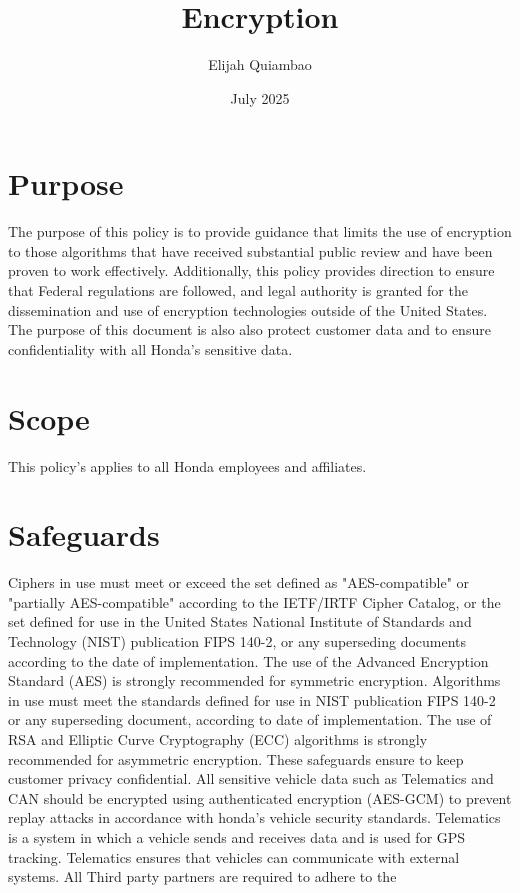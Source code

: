 \documentclass{article}
\title{Encryption}
\author{Elijah Quiambao}
\date{July 2025}
\begin{document}
\maketitle

\section{Purpose}
The purpose of this policy is to provide guidance that limits the use of encryption to those algorithms that have received substantial public review and have been proven to work effectively. Additionally, this policy provides direction to ensure that Federal regulations are followed, and legal authority is granted for the dissemination and use of encryption technologies outside of the United States. The purpose of this document is also also protect customer data and to ensure confidentiality with all Honda's sensitive data. 

\section{Scope}
This policy's applies to all Honda employees and affiliates.

\section{Safeguards}
Ciphers in use must meet or exceed the set defined as "AES-compatible" or "partially AES-compatible" according to the IETF/IRTF Cipher Catalog, or the set defined for use in the United States National Institute of Standards and Technology (NIST) publication FIPS 140-2, or any superseding documents according to the date of implementation. The use of the Advanced Encryption Standard (AES) is strongly recommended for symmetric encryption.
Algorithms in use must meet the standards defined for use in NIST publication FIPS 140-2 or any superseding document, according to date of implementation. The use of RSA and Elliptic Curve Cryptography (ECC) algorithms is strongly recommended for asymmetric encryption. These safeguards ensure to keep customer privacy confidential. All sensitive vehicle data such as Telematics and CAN should be encrypted using authenticated encryption (AES-GCM) to prevent replay attacks in accordance with honda's vehicle security standards. Telematics is a system in which a vehicle sends and receives data and is used for GPS tracking. Telematics ensures that vehicles can communicate with external systems. All Third party partners are required to adhere to the
\end{document}
